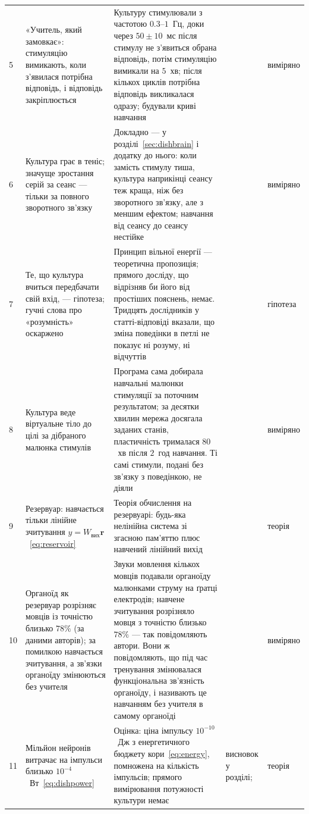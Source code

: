 {\begin{longtable}{>{\raggedright}p{0.5cm}>{\raggedright}p{4.0cm}>{\raggedright}p{5.6cm}>{\raggedright}p{2.3cm}>{\raggedright\arraybackslash}p{1.7cm}}
5 & «Учитель, який замовкає»: стимуляцію вимикають, коли з'явилася потрібна відповідь, і відповідь закріплюється & Культуру стимулювали з частотою $0.3$--$1$~Гц, доки через $50\pm10$~мс після стимулу не з'явиться обрана відповідь, потім стимуляцію вимикали на $5$~хв; після кількох циклів потрібна відповідь викликалася одразу; будували криві навчання & \cite{Shahaf2001} & виміряно \\
6 & Культура грає в теніс; значуще зростання серій за сеанс --- тільки за повного зворотного зв'язку & Докладно --- у розділі~\ref{sec:dishbrain} і додатку до нього: коли замість стимулу тиша, культура наприкінці сеансу теж краща, ніж без зворотного зв'язку, але з меншим ефектом; навчання від сеансу до сеансу нестійке & \cite{Kagan2022} & виміряно \\
7 & Те, що культура вчиться передбачати свій вхід, --- гіпотеза; гучні слова про «розумність» оскаржено & Принцип вільної енергії --- теоретична пропозиція; прямого досліду, що відрізняв би його від простіших пояснень, немає. Тридцять дослідників у статті-відповіді вказали, що зміна поведінки в петлі не показує ні розуму, ні відчуттів & \cite{Friston2010,Balci2023} & гіпотеза \\
8 & Культура веде віртуальне тіло до цілі за дібраного малюнка стимулів & Програма сама добирала навчальні малюнки стимуляції за поточним результатом; за десятки хвилин мережа досягала заданих станів, пластичність трималася $80$~хв після $2$~год навчання. Ті самі стимули, подані без зв'язку з поведінкою, не діяли & \cite{Bakkum2008} & виміряно \\
9 & Резервуар: навчається тільки лінійне зчитування $y=W_{\text{вих}}\mathbf r$~\eqref{eq:reservoir} & Теорія обчислення на резервуарі: будь-яка нелінійна система зі згасною пам'яттю плюс навчений лінійний вихід & \cite{Maass2002,JaegerHaas2004} & теорія \\
10 & Органоїд як резервуар розрізняє мовців із точністю близько $78\%$ (за даними авторів); за помилкою навчається зчитування, а зв'язки органоїду змінюються без учителя & Звуки мовлення кількох мовців подавали органоїду малюнками струму на ґратці електродів; навчене зчитування розрізняло мовця з точністю близько $78\%$ --- так повідомляють автори. Вони ж повідомляють, що під час тренування змінювалася функціональна зв'язність органоїду, і називають це навчанням без учителя в самому органоїді & \cite{Cai2023} & виміряно \\
11 & Мільйон нейронів витрачає на імпульси близько $10^{-4}$~Вт~\eqref{eq:dishpower} & Оцінка: ціна імпульсу $10^{-10}$~Дж з енергетичного бюджету кори~\eqref{eq:energy}, помножена на кількість імпульсів; прямого вимірювання потужності культури немає & висновок у розділі; \cite{Attwell2001} & теорія \\

\end{longtable}}
